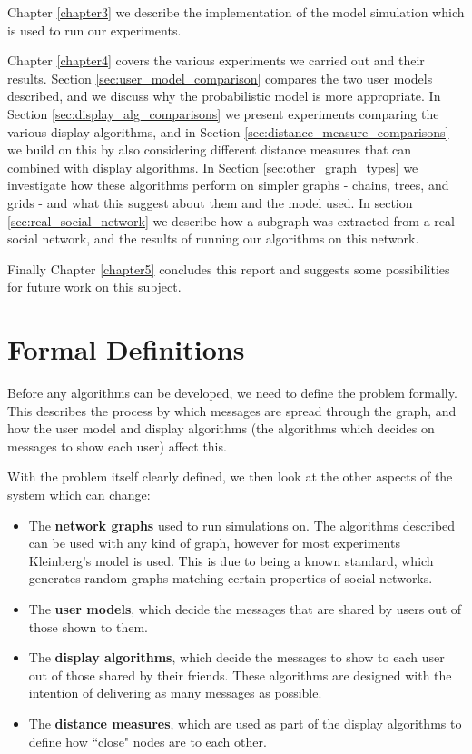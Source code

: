 \documentclass[bsc,frontabs,twoside,singlespacing,parskip,deptreport]{infthesis}     %
\begin{document}
Chapter \ref{chapter3} we describe the implementation of the model simulation which is used to run our experiments.

Chapter \ref{chapter4} covers the various experiments we carried out and their results. Section \ref{sec:user_model_comparison} compares the two user models described, and we discuss why the probabilistic model is more appropriate. In Section \ref{sec:display_alg_comparisons} we present experiments comparing the various display algorithms, and in Section \ref{sec:distance_measure_comparisons} we build on this by also considering different distance measures that can combined with display algorithms. In Section \ref{sec:other_graph_types} we investigate how these algorithms perform on simpler graphs - chains, trees, and grids - and what this suggest about them and the model used. In section \ref{sec:real_social_network} we describe how a subgraph was extracted from a real social network, and the results of running our algorithms on this network.

Finally Chapter \ref{chapter5} concludes this report and suggests some possibilities for future work on this subject.


\chapter{Formal Definitions} \label{chapter2}

Before any algorithms can be developed, we need to define the problem formally. This describes the process by which messages are spread through the graph, and how the user model and display algorithms (the algorithms which decides on messages to show each user) affect this.

With the problem itself clearly defined, we then look at the other aspects of the system which can change:
\begin{itemize}
\item The \textbf{network graphs} used to run simulations on. The algorithms described can be used with any kind of graph, however for most experiments Kleinberg's model is used. This is due to being a known standard, which generates random graphs matching certain properties of social networks.
\item The \textbf{user models}, which decide the messages that are shared by users out of those shown to them.
\item The \textbf{display algorithms}, which decide the messages to show to each user out of those shared by their friends. These algorithms are designed with the intention of delivering as many messages as possible.
\item The \textbf{distance measures}, which are used as part of the display algorithms to define how ``close" nodes are to each other.
\end{itemize}
\end{document}
